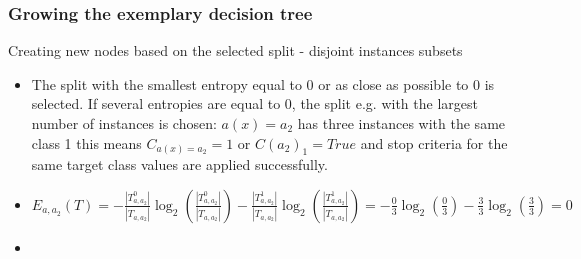 \documentclass[smaller, proffesionalfonts]{beamer}
\begin{document}
\begin{frame}
\frametitle{Growing the exemplary decision tree}
\begin{block}{Creating new nodes based on the selected split - disjoint instances subsets}
\begin{itemize}
\item
\justifying
The split with the smallest entropy equal to 0 or as close as possible to 0 is selected. If several entropies are equal to 0, the split e.g. with the largest number of instances is chosen: $a(x)=a_2$ has three instances with the same class 1 this means $C_{a(x)=a_2}=1$ or $C(a_2)_1=True$ and stop criteria for the same target class values are applied successfully. 
\item 
$E_{a,a_2}(T)= 
-\frac{|T^{0}_{a,a_2}|}{|T_{a,a_2}|}\log_2(\frac{|T^{0}_{a,a_2}|}{|T_{a,a_2}|}) 
-\frac{|T^{1}_{a,a_2}|}{|T_{a,a_2}|}\log_2(\frac{|T^{1}_{a,a_2}|}{|T_{a,a_2}|}) =
-\frac{0}{3}\log_2(\frac{0}{3})-\frac{3}{3}\log_2(\frac{3}{3})=0$
\item
\begin{minipage}[t]{.45\textwidth}
\hfill
\end{minipage}
\begin{minipage}[t]{.45\textwidth}
\end{minipage}
\end{itemize}
\end{block}
\end{frame}
\end{document}
